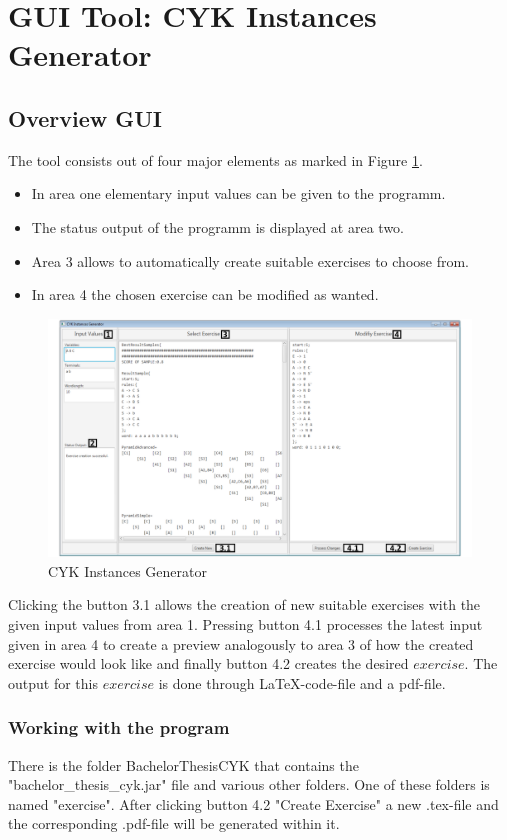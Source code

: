 
\section{GUI Tool: CYK Instances Generator }

\subsection{Overview GUI}
The tool consists out of four major elements as marked in Figure \ref{CYKInstancesGenerator}.
\begin{itemize}
	\item In area one elementary input values can be given to the programm.
	\item The status output of the programm is displayed at area two.
	\item Area 3 allows to automatically create suitable exercises to choose from.
	\item In area 4 the chosen exercise can be modified as wanted.
\end{itemize}
\begin{figure} [h]
	\centering
	\includegraphics[width=\textwidth]{abb/CYKInstancesGenerator.pdf}
	\caption{CYK Instances Generator}
	\label{CYKInstancesGenerator}
\end{figure}
Clicking the button 3.1 allows the creation of new suitable exercises with the given input values from area 1. Pressing button 4.1 processes the latest input given in area 4 to create a preview analogously to area 3 of how the created exercise would look like and finally button 4.2 creates the desired $exercise$. The output for this $exercise$ is done through \LaTeX-code-file and a pdf-file.
\subsubsection{Working with the program}
There is the folder BachelorThesisCYK that contains the "bachelor\_thesis\_cyk.jar" file and various other folders. One of these folders is named "exercise". After clicking button 4.2 "Create Exercise" a new .tex-file and the corresponding .pdf-file will be generated within it. 
\pagebreak
